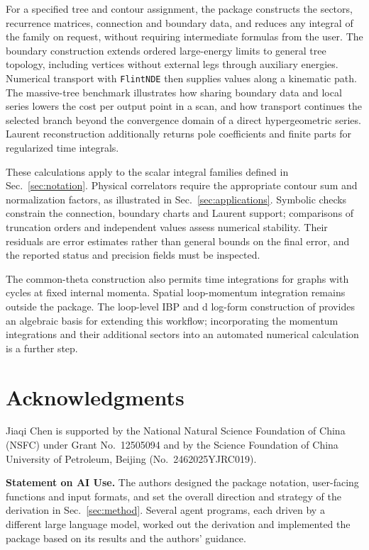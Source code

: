 \documentclass[11pt,a4paper]{article}
\numberwithin{table}{section}
\begin{document}
For a specified tree and contour assignment, the package constructs the sectors, recurrence
matrices, connection and boundary data, and reduces any integral of the family on request,
without requiring intermediate formulas from the user.
The boundary construction extends ordered large-energy limits to general tree topology,
including vertices without external legs through auxiliary energies. Numerical transport with
\texttt{FlintNDE} then supplies values along a kinematic path. The massive-tree benchmark
illustrates how sharing boundary data and local series lowers the cost per output point in a
scan, and how transport continues the selected branch beyond the convergence domain of a direct
hypergeometric series. Laurent reconstruction additionally returns pole coefficients and finite
parts for regularized time integrals.

These calculations apply to the scalar integral families defined in Sec.~\ref{sec:notation}.
Physical correlators require the appropriate contour sum and normalization factors, as illustrated
in Sec.~\ref{sec:applications}. Symbolic checks constrain the connection, boundary charts and
Laurent support; comparisons of truncation orders and independent values assess numerical
stability. Their residuals are error estimates rather than general bounds on the final error,
and the reported status and precision fields must be inspected.

The common-theta construction also permits time integrations for graphs with cycles at fixed
internal momenta. Spatial loop-momentum integration remains outside the package.
The loop-level IBP and d log-form construction of \cite{Chen:2026dqp} provides an algebraic
basis for extending this workflow; incorporating the momentum integrations and their additional
sectors into an automated numerical calculation is a further step.

\section*{Acknowledgments}

Jiaqi Chen is supported by the National Natural Science Foundation of China (NSFC) under
Grant No.~12505094 and by the Science Foundation of China University of Petroleum, Beijing
(No.~2462025YJRC019).

\medskip
\noindent\textbf{Statement on AI Use.}
The authors designed the package notation, user-facing functions and input formats, and set the
overall direction and strategy of the derivation in Sec.~\ref{sec:method}.
Several agent programs, each driven by a different large language model, worked out the derivation
and implemented the package based on its results and the authors' guidance.
\end{document}

